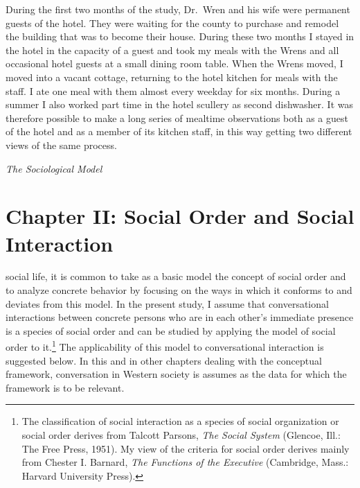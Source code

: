 \documentclass[twoside,symmetric,nobib,justified]{tufte-book}
\let\oldchapter\chapter
\def\chapter{%
  \setcounter{footnote}{0}%
  \oldchapter
}
\begin{document}
During the first two months of the study, Dr.~Wren and his wife were
permanent guests of the hotel. They were waiting for the county to
purchase and remodel the building that was to become their house. During
these two months I stayed in the hotel in the capacity of a guest and
took my meals with the Wrens and all occasional hotel guests at a small
dining room table. When the Wrens moved, I moved into a vacant cottage,
returning to the hotel kitchen for meals with the staff. I ate one meal
with them almost every weekday for six months. During a summer I also
worked part time in the hotel scullery as second dishwasher. It was
therefore possible to make a long series of mealtime observations both
as a guest of the hotel and as a member of its kitchen staff, in this
way getting two different views of the same process.


\newpage
\thispagestyle{empty}
\begin{fullwidth}

\begin{center}
\vspace*{3in}

{\fontsize{35}{24}\selectfont{Part Two}\par}

\vspace{1in}

{\fontsize{35}{24}\selectfont\textit{The Sociological Model}\par}

\end{center}



\chapter[CHAPTER II: SOCIAL ORDER AND SOCIAL INTERACTION]{Chapter II: Social Order and Social Interaction}
\label{ch:Chapter II: Social Order and Social Interaction}

\end{fullwidth}

 social life, it is common to take as a basic model the
concept of social order and to analyze concrete behavior by focusing on
the ways in which it conforms to and deviates from this model. In the
present study, I assume that conversational interactions between
concrete persons who are in each other's immediate presence is a species
of social order and can be studied by applying the model of social order
to it.\footnote{The classification of social interaction as a species of
  social organization or social order derives from Talcott Parsons,
  \emph{The Social System} (Glencoe, Ill.: The Free Press, 1951). My
  view of the criteria for social order derives mainly from Chester I.
  Barnard, \emph{The Functions of the Executive} (Cambridge, Mass.:
  Harvard University Press).} The applicability of this model to
conversational interaction is suggested below. In this and in other
chapters dealing with the conceptual framework, conversation in Western
society is assumes as the data for which the framework is to be
relevant.
\end{document}
